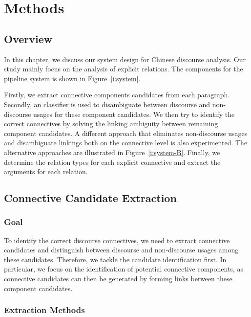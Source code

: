 %
%
%
\chapter{Methods}
\label{c:method}

\section{Overview}

In this chapter, we discuss our system design for Chinese discourse analysis.
Our study mainly focus on the analysis of explicit relations.
The components for the pipeline system is shown in Figure~\ref{i:system}.



Firstly, we extract connective components candidates from each paragraph.
Secondly, an classifier is used to disambiguate between discourse and
non-discourse usages for these component candidates. We then try to identify
the correct connectives by solving the linking ambiguity between remaining
component candidates.
A different approach that eliminates non-discourse usages and disambiguate
linkings both on the connective level is also experimented. The alternative
approaches are illustrated in Figure~\ref{i:system-B}.
Finally, we determine the relation types for each explicit
connective and extract the arguments for each relation.




\section{Connective Candidate Extraction}

\subsection{Goal}

To identify the correct discourse connectives, we need to
extract connective candidates and distinguish between discourse
and non-discourse usages among these candidates. Therefore, we tackle the
candidate identification first. In particular, we focus on the identification
of potential connective components, as connective candidates can then be
generated by forming links between these component candidates.

\subsection{Extraction Methods}

